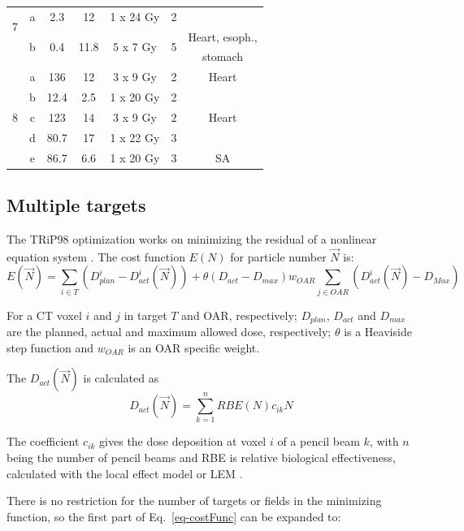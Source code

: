 \begin{table}[H]
\begin{tabular}{c|c|c|c|c|c|c}
		 \hline
		 \multirow{2}{*}{7} & a & 2.3 & 12  & 1 x 24 Gy & 2 &\\
		 & \multirow{2}{*}{b} & \multirow{2}{*}{0.4} & \multirow{2}{*}{11.8}  & \multirow{2}{*}{5 x 7 Gy} & \multirow{2}{*}{5} & Heart, esoph., \\
		 & & & & & & stomach \\
		 \hline
		 \multirow{5}{*}{8} & a & 136 & 12  & 3 x 9 Gy & 2 & Heart\\
		  & b & 12.4 & 2.5  & 1 x 20 Gy & 2 &\\
		  & c & 123 & 14  & 3 x 9 Gy & 2  &Heart \\
		 & d & 80.7 & 17  & 1 x 22 Gy & 3  &\\
		 & e & 86.7 & 6.6  & 1 x 20 Gy & 3 & SA \\
		\hline\hline
	\end{tabular}
	\label{tab:patdata2}
\end{table}


\newpage

\subsection{Multiple targets}

The TRiP98 optimization works on minimizing the residual of a nonlinear equation system \cite{Kraemer2000a}. The cost function $E(N)$ for particle number $\vec{N}$ is:
\begin{equation}
\label{eq-costFunc}
 E(\vec{N}) = \sum_{i\in T} \left( D_{plan}^{i} - D_{act}^{i}(\vec{N})\right) +  \theta(D_{act}-D_{max})w_{OAR}\sum_{j\in OAR} \left( D_{act}^{i}(\vec{N}) - D_{Max} \right)
\end{equation}

For a CT voxel $i$ and $j$ in target $T$ and OAR, respectively; $ D_{plan}$, $D_{act}$ and $D_{max}$ are the planned, actual and maximum allowed dose, respectively; $\theta$ is a 
Heaviside step function and $w_{OAR}$ is an OAR specific weight.

The $D_{act}(\vec{N})$ is calculated as
\begin{equation}
 D_{act}(\vec{N}) = \sum_{k=1}^n RBE(N) c_{ik}N 
\end{equation}

The coefficient $c_{ik}$ gives the dose deposition at voxel $i$ of a pencil beam $k$, 
with $n$ being the number of pencil beams and RBE is relative biological effectiveness, calculated with the local effect model or LEM \cite{Elsaesser2010} . 

There is no restriction for the number of targets or fields in the minimizing function, so the first part of Eq.~\ref{eq-costFunc} can be expanded to:

